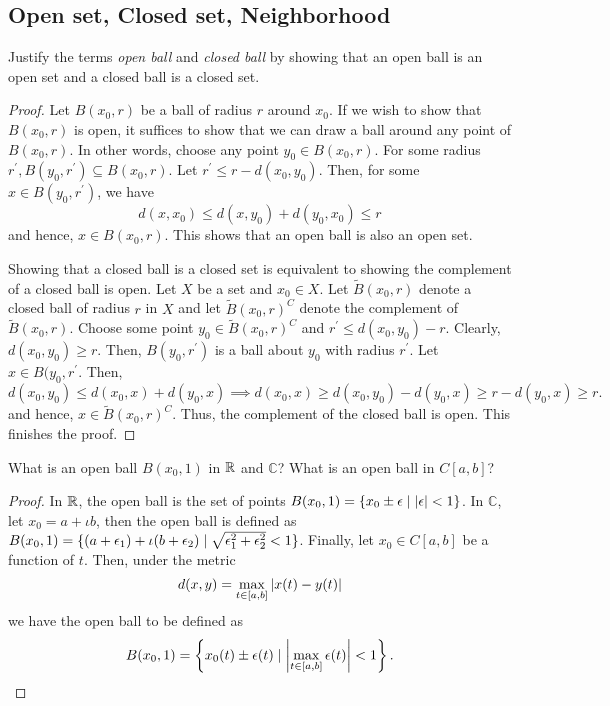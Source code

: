 \subsection{Open set, Closed set, Neighborhood}

\begin{question}
    Justify the terms \emph{open ball} and \emph{closed ball} by showing that an open ball is an open set and a closed ball is a closed set.
    \label{section1.3-1}
\end{question}
\begin{proof}
    Let $B(x_0 , r)$ be a ball of radius $r$ around $x_0$. If we wish to show that $B(x_0 , r)$ is open, it suffices to show that we can draw a ball around any point of $B(x_0,r)$. In other words, choose any point $y_0 \in B(x_0 , r)$. For some radius $r^\prime, B(y_0 , r^\prime) \subseteq B(x_0 , r)$.
    Let $r^\prime \leq r - d(x_0 , y_0)$. Then, for some $x \in B(y_0 , r^\prime)$, we have
    \[d(x,x_0) \leq d(x,y_0) + d(y_0,x_0) \leq r\]
    and hence, $x \in B(x_0 , r)$. This shows that an open ball is also an open set.

    Showing that a closed ball is a closed set is equivalent to showing the complement of a closed ball is open. Let $X$ be a set and $x_0 \in X$. Let $\tilde{B}(x_0 , r)$ denote a closed ball of radius $r$ in $X$ and let $\tilde{B}(x_0 , r)^C$ denote the complement of $\tilde{B}(x_0 , r)$. 
    Choose some point $y_0 \in \tilde{B}(x_0 , r)^C$ and $r^\prime \leq d(x_0 , y_0) - r$. Clearly, $d(x_0 , y_0) \geq r$. Then, $B(y_0,r^\prime)$ is a ball about $y_0$ with radius $r^\prime$. Let $x \in B(y_0,r^\prime$. Then,
    \[d(x_0,y_0) \leq d(x_0,x) + d(y_0,x) \implies d(x_0,x) \geq d(x_0,y_0) - d(y_0,x) \geq r - d(y_0,x) \geq r.\]
    and hence, $x \in \tilde{B}(x_0,r)^C$. Thus, the complement of the closed ball is open. This finishes the proof.
\end{proof}

\begin{question}
    What is an open ball $B(x_0  ,1)$ in $\mathbb{R}$ and $\mathbb{C}$? What is an open ball in $C[a,b]$?
    \label{section1.3-2}
\end{question}
\begin{proof}
    In $\mathbb{R}$, the open ball is the set of points $B(x_0 , 1) = \{x_0 \pm \epsilon \mid \left\lvert \epsilon \right\rvert < 1\}$. In $\mathbb{C}$, let $x_0 = a + \iota b$, then the open ball is defined as $B(x_0 , 1) = \{(a + \epsilon_1) + \iota (b + \epsilon_2) \mid \sqrt{\epsilon_1^2 + \epsilon_2^2} < 1 \}$. Finally, let $x_0 \in C[a,b]$ be a function of $t$. Then, under the metric
    \[d(x,y) = \max_{t \in [a,b]} \left\lvert x(t) - y(t) \right\rvert\]
    we have the open ball to be defined as
    \[B(x_0 , 1) = \left\{x_0(t) \pm \epsilon(t) \mid \left\lvert \max_{t \in [a,b]}\epsilon(t) \right\rvert < 1\right\}.\]
\end{proof}

